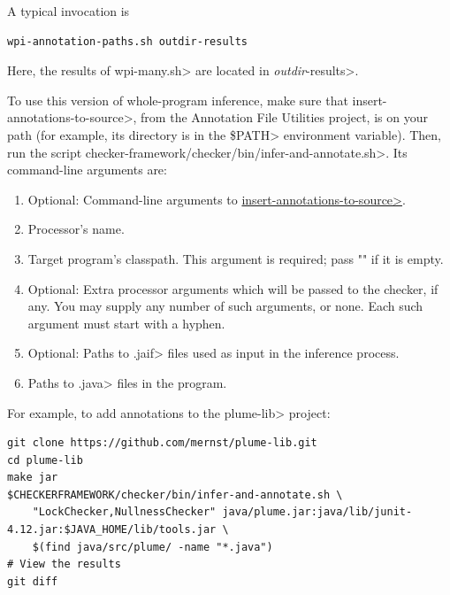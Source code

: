 A typical invocation is

\begin{Verbatim}
wpi-annotation-paths.sh outdir-results
\end{Verbatim}

Here, the results of \<wpi-many.sh> are located in \<\emph{outdir}-results>.


\begin{sloppypar}
To use this version of whole-program inference, make sure that
\<insert-annotations-to-source>, from the Annotation File Utilities project,
is on your path (for example, its directory is in the \<\$PATH> environment variable).
Then, run the script \<checker-framework/checker/bin/infer-and-annotate.sh>.
Its command-line arguments are:
\end{sloppypar}

\begin{enumerate}
\item Optional: Command-line arguments to
  \href{https://checkerframework.org/annotation-file-utilities/#insert-annotations-to-source}{\<insert-annotations-to-source>}.
\item Processor's name.
\item Target program's classpath.  This argument is required; pass "" if it
  is empty.
\item Optional: Extra processor arguments which will be passed to the checker, if any.
  You may supply any number of such arguments, or none.  Each such argument
  must start with a hyphen.
\item Optional: Paths to \<.jaif> files used as input in the inference
    process.
\item Paths to \<.java> files in the program.
\end{enumerate}

For example, to add annotations to the \<plume-lib> project:
\begin{Verbatim}
git clone https://github.com/mernst/plume-lib.git
cd plume-lib
make jar
$CHECKERFRAMEWORK/checker/bin/infer-and-annotate.sh \
    "LockChecker,NullnessChecker" java/plume.jar:java/lib/junit-4.12.jar:$JAVA_HOME/lib/tools.jar \
    $(find java/src/plume/ -name "*.java")
# View the results
git diff
\end{Verbatim}

